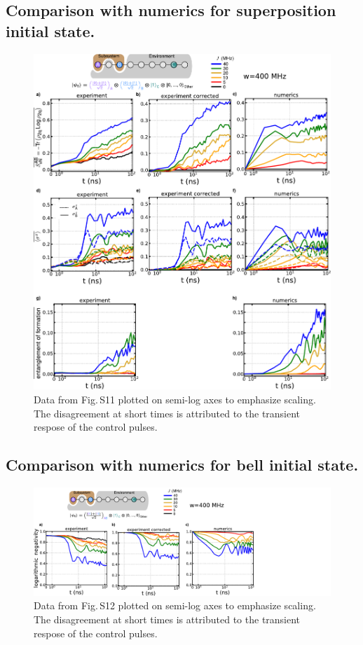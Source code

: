 \subsection{Comparison with numerics for superposition initial state.}
\begin{figure}
\centering
\includegraphics[width=140mm, keepaspectratio]{./PDF/dat_cor_num_superposition_log.pdf}
\caption{Data from Fig.\,S11 plotted on semi-log axes to emphasize scaling.  The disagreement at short times is attributed to the transient respose of the control pulses.}
\end{figure}

\subsection{Comparison with numerics for bell initial state.}
\begin{figure}
\centering
\hspace*{10mm}
\includegraphics[width=195mm, keepaspectratio]{./PDF/dat_cor_num_bell_log.pdf}
\caption{Data from Fig.\,S12 plotted on semi-log axes to emphasize scaling.  The disagreement at short times is attributed to the transient respose of the control pulses.}
\end{figure}

